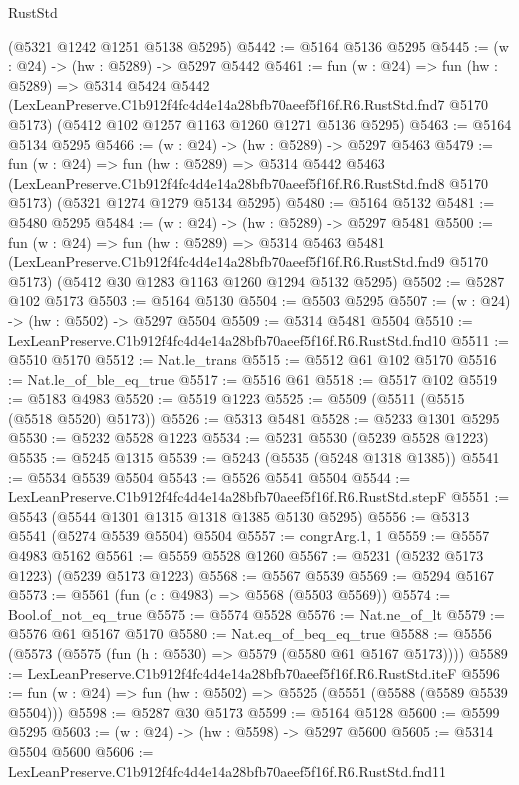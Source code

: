 \begin{lexlean}{RustStd}
\begin{coremodule}
    (@5321 @1242 @1251 @5138 @5295)
@5442 := @5164 @5136 @5295
@5445 := (w : @24) -> (hw : @5289) -> @5297 @5442
@5461 := fun (w : @24) =>
  fun (hw : @5289) =>
  @5314
    @5424
    @5442
    (LexLeanPreserve.C1b912f4fc4d4e14a28bfb70aeef5f16f.R6.RustStd.fnd7 @5170 @5173)
    (@5412 @102 @1257 @1163 @1260 @1271 @5136 @5295)
@5463 := @5164 @5134 @5295
@5466 := (w : @24) -> (hw : @5289) -> @5297 @5463
@5479 := fun (w : @24) =>
  fun (hw : @5289) =>
  @5314
    @5442
    @5463
    (LexLeanPreserve.C1b912f4fc4d4e14a28bfb70aeef5f16f.R6.RustStd.fnd8 @5170 @5173)
    (@5321 @1274 @1279 @5134 @5295)
@5480 := @5164 @5132
@5481 := @5480 @5295
@5484 := (w : @24) -> (hw : @5289) -> @5297 @5481
@5500 := fun (w : @24) =>
  fun (hw : @5289) =>
  @5314
    @5463
    @5481
    (LexLeanPreserve.C1b912f4fc4d4e14a28bfb70aeef5f16f.R6.RustStd.fnd9 @5170 @5173)
    (@5412 @30 @1283 @1163 @1260 @1294 @5132 @5295)
@5502 := @5287 @102 @5173
@5503 := @5164 @5130
@5504 := @5503 @5295
@5507 := (w : @24) -> (hw : @5502) -> @5297 @5504
@5509 := @5314 @5481 @5504
@5510 := LexLeanPreserve.C1b912f4fc4d4e14a28bfb70aeef5f16f.R6.RustStd.fnd10
@5511 := @5510 @5170
@5512 := Nat.le_trans
@5515 := @5512 @61 @102 @5170
@5516 := Nat.le_of_ble_eq_true
@5517 := @5516 @61
@5518 := @5517 @102
@5519 := @5183 @4983
@5520 := @5519 @1223
@5525 := @5509 (@5511 (@5515 (@5518 @5520) @5173))
@5526 := @5313 @5481
@5528 := @5233 @1301 @5295
@5530 := @5232 @5528 @1223
@5534 := @5231 @5530 (@5239 @5528 @1223)
@5535 := @5245 @1315
@5539 := @5243 (@5535 (@5248 @1318 @1385))
@5541 := @5534 @5539 @5504
@5543 := @5526 @5541 @5504
@5544 := LexLeanPreserve.C1b912f4fc4d4e14a28bfb70aeef5f16f.R6.RustStd.stepF
@5551 := @5543 (@5544 @1301 @1315 @1318 @1385 @5130 @5295)
@5556 := @5313 @5541 (@5274 @5539 @5504) @5504
@5557 := congrArg.{1, 1}
@5559 := @5557 @4983 @5162
@5561 := @5559 @5528 @1260
@5567 := @5231 (@5232 @5173 @1223) (@5239 @5173 @1223)
@5568 := @5567 @5539
@5569 := @5294 @5167
@5573 := @5561 (fun (c : @4983) => @5568 (@5503 @5569))
@5574 := Bool.of_not_eq_true
@5575 := @5574 @5528
@5576 := Nat.ne_of_lt
@5579 := @5576 @61 @5167 @5170
@5580 := Nat.eq_of_beq_eq_true
@5588 := @5556 (@5573 (@5575 (fun (h : @5530) => @5579 (@5580 @61 @5167 @5173))))
@5589 := LexLeanPreserve.C1b912f4fc4d4e14a28bfb70aeef5f16f.R6.RustStd.iteF
@5596 := fun (w : @24) => fun (hw : @5502) => @5525 (@5551 (@5588 (@5589 @5539 @5504)))
@5598 := @5287 @30 @5173
@5599 := @5164 @5128
@5600 := @5599 @5295
@5603 := (w : @24) -> (hw : @5598) -> @5297 @5600
@5605 := @5314 @5504 @5600
@5606 := LexLeanPreserve.C1b912f4fc4d4e14a28bfb70aeef5f16f.R6.RustStd.fnd11

\end{coremodule}
\end{lexlean}
